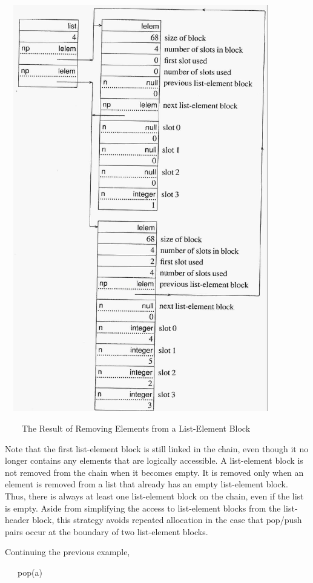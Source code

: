 \ \  \includegraphics[width=4.3811in,height=6.9937in]{ib-img/ib-img031.jpg} 


\ \ \ \ The Result of Removing Elements from a List-Element Block


Note that the first list-element block is still linked in the chain,
even though it no longer contains any elements that are logically
accessible. A list-element block is not removed from the chain when it
becomes empty. It is removed only when an element is removed from a
list that already has an empty list-element block. Thus, there is
always at least one list-element block on the chain, even if the list
is empty. Aside from simplifying the access to list-element blocks
from the list-header block, this strategy avoids repeated allocation
in the case that pop/push pairs occur at the boundary of two
list-element blocks.

Continuing the previous example,

{\ttfamily\mdseries
\ \ \ pop(a)}


